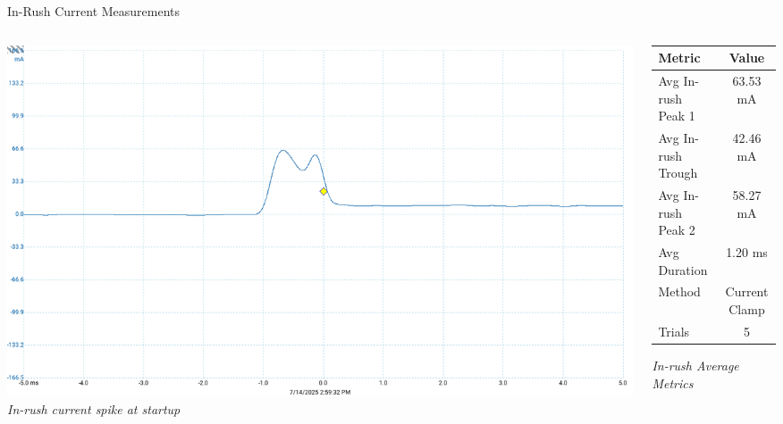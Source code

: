 \begin{frame}{In-Rush Current Measurements}
\begin{columns}

    \begin{column}{0.6\textwidth}
        \centering
        \includegraphics[width=\linewidth]{images/inrush_1core_baseline.png}
        \vspace{0.5em}
        {\small \textit{In-rush current spike at startup}}
    \end{column}

    \begin{column}{0.45\textwidth}
        \centering
        \begin{tabular}{|l|c|}
            \hline
            \textbf{Metric} & \textbf{Value} \\
            \hline
            Avg In-rush Peak 1 & 63.53 mA \\
            Avg In-rush Trough & 42.46 mA \\
            Avg In-rush Peak 2 & 58.27 mA \\
            Avg Duration     & 1.20 ms \\
            Method           & Current Clamp \\
            Trials           & 5 \\
            \hline
        \end{tabular}
        \vspace{0.5em}
        {\small \textit{In-rush Average Metrics}}
    \end{column}
\end{columns}
\end{frame}

